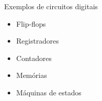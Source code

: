 
\begin{frame}{Exemplos de circuitos digitais}

    \begin{itemize}
        \item Flip-flops
        \item Registradores
        \item Contadores
        \item Memórias
        \item Máquinas de estados
    \end{itemize}
\end{frame}
